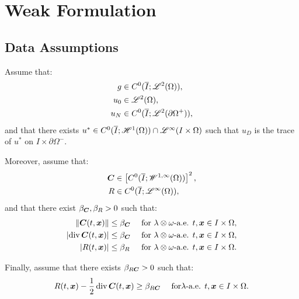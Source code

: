 \newpage
\section{Weak Formulation}

\subsection{Data Assumptions} \label{assumptions}

Assume that:
\begin{align}
    g & \in C^0(\overline{I}; \mathscr{L}^{2}(\Omega)), \label{equation:ass_1} \\
    u_0 & \in \mathscr{L}^{2}(\Omega), \label{equation:ass_2} \\
    u_N & \in C^0(\overline{I}; \mathscr{L}^{2}(\partial \Omega^+)), \label{equation:ass_3}
\end{align}
and that there exists $u^* \in C^0(\overline{I}; \mathscr{H}^{1}(\Omega)) \cap \mathscr{L}^{\infty}(I \times \Omega)$ such that $u_D$ is the trace of $u^*$ on $I \times \partial \Omega^-$.

Moreover, assume that:
\begin{align}
    \bm{C} & \in \left[ C^0(\overline{I}; \mathscr{W}^{1, \infty}(\Omega)) \right]^2, \label{equation:ass_4} \\
    R & \in C^0(\overline{I}; \mathscr{L}^{\infty}(\Omega)), \label{equation:ass_5}
\end{align}
and that there exist $\beta_{\bm{C}}, \beta_{R} > 0$ such that:
\begin{align}
    \lVert \bm{C}(t, \bm{x}) \rVert & \leq \beta_{\bm{C}} &\text{ for } \lambda \otimes \omega \text{-a.e. } t, \bm{x} \in I \times \Omega, \label{equation:ass_6} \\
    \lvert \operatorname*{div} \bm{C}(t, \bm{x}) \rvert & \leq \beta_{\bm{C}} &\text{ for } \lambda \otimes \omega \text{-a.e. } t, \bm{x} \in I \times \Omega, \label{equation:ass_7} \\
    \lvert R(t, \bm{x}) \rvert & \leq \beta_{R} &\text{ for } \lambda \otimes \omega \text{-a.e. } t, \bm{x} \in I \times \Omega. \label{equation:ass_8}
\end{align}

Finally, assume that there exists $\beta_{R \bm{C}} > 0$ such that:
\begin{align}
    R(t, \bm{x}) - \frac{1}{2} \operatorname*{div} \bm{C}(t, \bm{x}) & \geq \beta_{R \bm{C}} &\text{ for} \lambda \text{-a.e. } t, \bm{x} \in I \times \Omega. \label{equation:ass_9}
\end{align}

